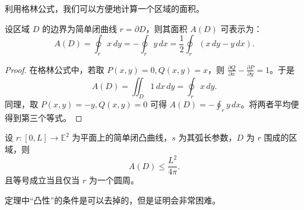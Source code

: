 \documentclass[lang=cn,10pt,thmcnt=section]{elegantbook}
\begin{document}
利用格林公式，我们可以方便地计算一个区域的面积。

\begin{corollary}[面积公式]\label{cor:area}
    设区域 $D$ 的边界为简单闭曲线 $r = \partial D$，则其面积 $A(D)$ 可表示为：
    \[
    A(D) = \oint_{r} x \, dy = -\oint_{r} y \, dx = \frac{1}{2} \oint_{r} (x \, dy - y \, dx).
    \]
\end{corollary}
\begin{proof}
    在格林公式中，若取 $P(x,y) = 0, Q(x,y) = x$，则 $\frac{\partial Q}{\partial x} - \frac{\partial P}{\partial y} = 1$。于是
    \[ A(D) = \iint_D 1 \, dx \, dy = \oint_{r} x \, dy. \]
    同理，取 $P(x,y) = -y, Q(x,y) = 0$ 可得 $A(D) = -\oint_{r} y \, dx$。将两者平均便得到第三个等式。
\end{proof}
\begin{theorem}[等周不等式]\label{thm:isoperimetric}
    设 $r : [0, L] \rightarrow \mathbb{E}^2$ 为平面上的简单闭凸曲线，$s$ 为其弧长参数，$D$ 为 $r$ 围成的区域，则
    \[
    A(D) \leq \frac{L^2}{4\pi}.
    \]
    且等号成立当且仅当 $r$ 为一个圆周。
\end{theorem}
\begin{remark}
    定理中“凸性”的条件是可以去掉的，但是证明会非常困难。
\end{remark}
\end{document}
